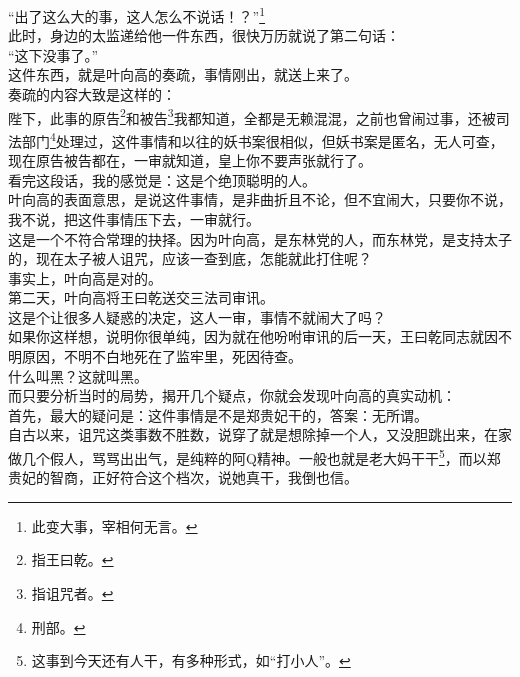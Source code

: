 \begin{multicols}{\theparacolNo}
“出了这么大的事，这人怎么不说话！？”\footnote{此变大事，宰相何无言。}\\

此时，身边的太监递给他一件东西，很快万历就说了第二句话：\\

“这下没事了。”\\

这件东西，就是叶向高的奏疏，事情刚出，就送上来了。\\

奏疏的内容大致是这样的：\\

陛下，此事的原告\footnote{指王曰乾。}和被告\footnote{指诅咒者。}我都知道，全都是无赖混混，之前也曾闹过事，还被司法部门\footnote{刑部。}处理过，这件事情和以往的妖书案很相似，但妖书案是匿名，无人可查，现在原告被告都在，一审就知道，皇上你不要声张就行了。\\

看完这段话，我的感觉是：这是个绝顶聪明的人。\\

叶向高的表面意思，是说这件事情，是非曲折且不论，但不宜闹大，只要你不说，我不说，把这件事情压下去，一审就行。\\

这是一个不符合常理的抉择。因为叶向高，是东林党的人，而东林党，是支持太子的，现在太子被人诅咒，应该一查到底，怎能就此打住呢？\\

事实上，叶向高是对的。\\

第二天，叶向高将王曰乾送交三法司审讯。\\

这是个让很多人疑惑的决定，这人一审，事情不就闹大了吗？\\

如果你这样想，说明你很单纯，因为就在他吩咐审讯的后一天，王曰乾同志就因不明原因，不明不白地死在了监牢里，死因待查。\\

什么叫黑？这就叫黑。\\

而只要分析当时的局势，揭开几个疑点，你就会发现叶向高的真实动机：\\

首先，最大的疑问是：这件事情是不是郑贵妃干的，答案：无所谓。\\

自古以来，诅咒这类事数不胜数，说穿了就是想除掉一个人，又没胆跳出来，在家做几个假人，骂骂出出气，是纯粹的阿Q精神。一般也就是老大妈干干\footnote{这事到今天还有人干，有多种形式，如“打小人”。}，而以郑贵妃的智商，正好符合这个档次，说她真干，我倒也信。\\


\end{multicols}
